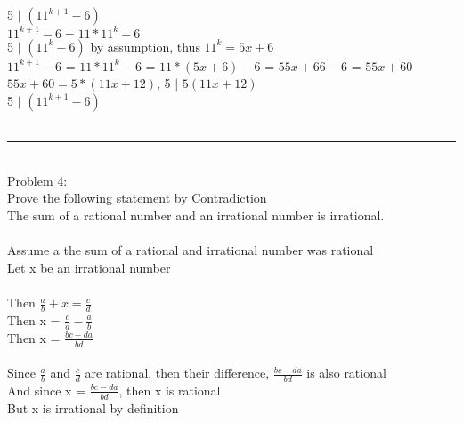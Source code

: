 \documentclass{article}
\begin{document}
    5 $|$ $(11^{k+1} - 6)$\\
    $11^{k+1} - 6 = 11*11^k - 6$\\
    5 $|$ $(11^k - 6)$ by assumption, thus $11^k = 5x + 6$\\
    $11^{k+1} - 6$  =  $11*11^k - 6$  =  $11 * (5x + 6) - 6$  =  $55x + 66 - 6$  =  $55x + 60$\\
    $55x + 60 = 5*(11x + 12)$, 5 $|$ $5(11x + 12)$\\
    5 $|$ $(11^{k+1} - 6)$\\
    \\
    \rule{\textwidth}{0.5pt}\\
    Problem 4: \\
    Prove the following statement by Contradiction\\
    The sum of a rational number and an irrational number is irrational.\\
    \\
    Assume a the sum of a rational and irrational number was rational\\
    Let x be an irrational number\\\\
    Then $\frac{a}{b} + x = \frac{c}{d}$\\
    Then x = $\frac{c}{d} - \frac{a}{b}$\\
    Then x = $\frac{bc - da}{bd}$\\\\
    Since $\frac{a}{b}$ and $\frac{c}{d}$ are rational, then their difference, $\frac{bc - da}{bd}$ is also rational\\
    And since x = $\frac{bc - da}{bd}$, then x is rational\\
    But x is irrational by definition
\end{document}
